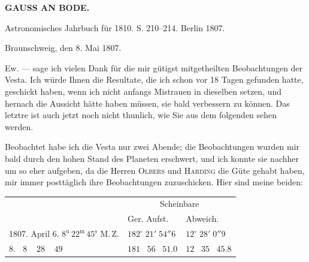 \begin{flushright}
\end{flushright}
\clearpage
{}
%
\begin{center}
\textbf{GAUSS AN BODE.}

\hrulefill

Astronomisches Jahrbuch für 1810. S. 210–214. Berlin 1807.

\hrulefill
\end{center}

\begin{flushright}
Braunschweig, den 8. Mai 1807.
\end{flushright}

\par\indent Ew. --- sage ich vielen Dank für die mir gütigst mitgetheilten Beobachtungen der Vesta. Ich
würde Ihnen die Resultate, die ich schon vor 18 Tagen gefunden hatte, geschickt haben, wenn ich
nicht anfangs Mistrauen in dieselben setzen, und hernach die Aussicht hätte haben müssen, sie bald
verbessern zu können. Das letztre ist auch jetzt noch nicht thunlich, wie Sie aus dem folgenden
sehen werden.

\par\indent Beobachtet habe ich die Vesta nur zwei Abende; die Beobachtungen wurden mir bald durch den
hohen Stand des Planeten erschwert, und ich konnte sie nachher um so eher aufgeben, da die Herren
\textsc{Olbers} und \textsc{Harding} die Güte gehabt haben, mir immer posttäglich ihre Beobachtungen zuzuschicken.
Hier sind meine beiden:

\begin{center}\begingroup
\fontsize{9}{11}\selectfont
\setlength{\tabcolsep}{3pt}\renewcommand{\arraystretch}{1.15}
\begin{tabular}{l|l|l}
& \multicolumn{2}{c}{Scheinbare} \\
& Ger. Aufst. \VestaAltarRA{} & Abweich. \VestaAltarDecl{} \\
\hline
1807. April 6. $8^{\mathrm u}\,22^{\mathrm m}\,45^{\mathrm s}$ M.\,Z. & $182^\circ\;21'\;54''6$ & $12^\circ\;28'\;0''9$ \\
\phantom{1807. April} 8. $\;\;8\;\;\;\;28\;\;\;\;49$ & $181\;\;\;56\;\;\;51.0$ & $12\;\;\;35\;\;\;45.8$ \\
\end{tabular}\endgroup\end{center}

